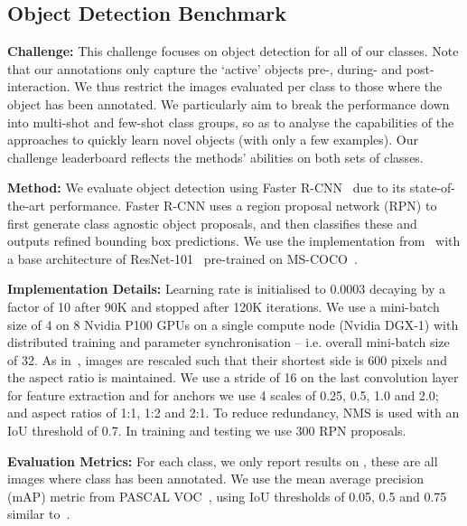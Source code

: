 \documentclass[runningheads]{llncs}
\begin{document}
\vspace{-6mm}
\subsection{Object Detection Benchmark}
\label{subsec:obj_challenges}
\vspace*{-2mm}
\noindent\textbf{Challenge:}
This challenge focuses on object detection for all of our  classes. 
Note that our annotations only capture the `active' objects pre-, during- and post- interaction. 
We thus restrict the images evaluated per class to those where the object has been annotated.
We particularly aim to break the performance down into multi-shot and few-shot class groups, so as to analyse the capabilities of the approaches to quickly learn novel objects (with only a few examples). Our challenge leaderboard reflects the methods' abilities on both sets of classes. 

\noindent\textbf{Method:} We evaluate object detection using Faster R-CNN~\cite{ren2015faster} due to its state-of-the-art performance. Faster R-CNN uses a region proposal network (RPN) to first generate class agnostic object proposals, and then classifies these and outputs refined bounding box predictions. We use the implementation from~\cite{objapi,huang2017speed} with a base architecture of ResNet-101~\cite{resnet} pre-trained on MS-COCO~\cite{coco}.

\noindent\textbf{Implementation Details:} Learning rate is initialised to 0.0003 decaying by a factor of 10 after 90K and stopped after 120K iterations.  We use a mini-batch size of 4 on 8 Nvidia P100 GPUs on a single compute node (Nvidia DGX-1) with distributed training and parameter synchronisation -- i.e. overall mini-batch size of 32. As in~\cite{ren2015faster}, images are rescaled such that their shortest side is 600 pixels and the aspect ratio is maintained. We use a stride of 16 on the last convolution layer for feature extraction and for anchors we use 4 scales of 0.25, 0.5, 1.0 and 2.0; and aspect ratios of 1:1, 1:2 and 2:1. To reduce redundancy, NMS is used with an IoU threshold of 0.7. In training and testing we use 300 RPN proposals.

\noindent\textbf{Evaluation Metrics:}
For each class, we only report results on , these are all images where class  has been annotated. We use the mean average precision (mAP) metric from PASCAL VOC~\cite{pascal}, using IoU thresholds of 0.05, 0.5 and 0.75 similar to~\cite{coco}. 
\end{document}
